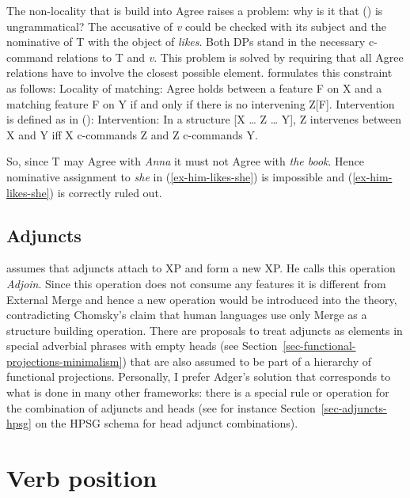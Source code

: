 The non-locality that is build into Agree raises a problem: why is it that () is
ungrammatical?
\z
The accusative of \textit{v} could be checked with its subject and the nominative of T with the
object of \emph{likes}. Both DPs stand in the necessary c-command relations to T and \textit{v}. This
problem is solved by requiring that all Agree relations have to involve the closest possible
element. \citet[]{Adger2003a} formulates this constraint as follows:
\ea
\label{principle-locality-of-matching}
Locality of matching: Agree holds between a feature F on X and a matching feature F on Y if and only
if there is no intervening Z[F].
\z
Intervention is defined as in ():
\ea
\label{def-intervention}
Intervention: In a structure [X \ldots{} Z \ldots{} Y], Z intervenes between X and Y iff X
c-commands Z and Z c-commands Y.
\z

So, since T may Agree with \emph{Anna} it must not Agree with \emph{the book}. Hence
nominative assignment to \emph{she} in (\ref{ex-him-likes-she}) is impossible and (\ref{ex-him-likes-she}) is correctly ruled out.

\subsection{Adjuncts}

\citet[Section~4.2.3]{Adger2003a} assumes that adjuncts attach to XP and form a new XP. He calls
this operation \emph{Adjoin}. Since this operation does not consume any features it is different from
External Merge and hence a new operation would be introduced into the theory, contradicting
Chomsky's claim that human languages use only Merge as a structure building
operation. There are
proposals to treat adjuncts as elements in special adverbial phrases with empty heads (see
Section~\ref{sec-functional-projections-minimalism}) that are also assumed to be part of a hierarchy of functional
projections. Personally, I prefer Adger's solution that corresponds to what is done in many other
frameworks: there is a special rule or operation for the combination of adjuncts and heads (see for instance
Section~\ref{sec-adjuncts-hpsg} on the HPSG schema for head adjunct combinations).


\section{Verb position}
\label{sec-verb-position-MP}

